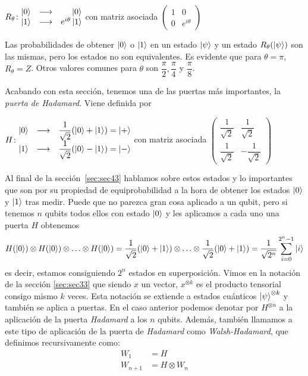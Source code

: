 $\gatetwo{R_\theta}{\ \ \ \ \ket0}{e^{i\theta}\ket1}$ con matriz asociada $\left(\begin{matrix}1&0\\ 0&e^{i\theta}\end{matrix}\right)$

Las probabilidades de obtener $\left|0\right\rangle$ o $\left|1\right\rangle$ en un estado $\left|\psi\right\rangle$ y un estado $R_\theta(\left|\psi\right\rangle)$ son las mismas, pero los estados no son equivalentes. Es evidente que para $\theta=\pi$, $R_\theta=Z$. Otros valores comunes para $\theta$ son $\dfrac{\pi}{2},\dfrac{\pi}{4}$ y $\dfrac{\pi}{8}$.

Acabando con esta sección, tenemos una de las puertas más importantes, la \textit{puerta de Hadamard}. Viene definida por

$H\colon \begin{matrix}\left|0\right\rangle&\longrightarrow& \dfrac{1}{\sqrt{2}}(\left|0\right\rangle+\left|1\right\rangle)=\left|+\right\rangle\\ \left|1\right\rangle&\longrightarrow& \dfrac{1}{\sqrt{2}}(\left|0\right\rangle-\left|1\right\rangle)=\left|-\right\rangle\end{matrix}$ con matriz asociada $\left(\begin{matrix}\dfrac{1}{\sqrt{2}}&\dfrac{1}{\sqrt{2}}\\ \dfrac{1}{\sqrt{2}}&-\dfrac{1}{\sqrt{2}}\end{matrix}\right)$

Al final de la sección~\ref{sec:sec43} hablamos sobre estos estados y lo importantes que son por su propiedad de equiprobabilidad a la hora de obtener los estados $\left|0\right\rangle$ y $\left|1\right\rangle$ tras medir. Puede que no parezca gran cosa aplicado a un qubit, pero si tenemos $n$ qubits todos ellos con estado $\left|0\right\rangle$ y les aplicamos a cada uno una puerta $H$ obtenemos
\begin{equation}
\label{eq:eq43}
H(\left|0\right\rangle)\otimes H(\left|0\right\rangle)\otimes\hdots\otimes H(\left|0\right\rangle)=\dfrac{1}{\sqrt{2}}(\left|0\right\rangle+\left|1\right\rangle)\otimes\hdots\otimes\dfrac{1}{\sqrt{2}}(\left|0\right\rangle+\left|1\right\rangle)=\dfrac{1}{\sqrt{2^n}}\sum_{i=0}^{2^n-1}\left|i\right\rangle
\end{equation}
%
es decir, estamos consiguiendo $2^n$ estados en superposición. Vimos en la notación de la sección \ref{sec:sec33} que siendo $x$ un vector, $x^{\otimes k}$ es el producto tensorial consigo mismo $k$ veces. Esta notación se extiende a estados cuánticos $\left|\psi\right\rangle^{\otimes k}$ y también se aplica a puertas. En el caso anterior podemos denotar por $H^{\otimes n}$ a la aplicación de la puerta \textit{Hadamard} a los $n$ qubits. Además, también llamamos a este tipo de aplicación de la puerta de \textit{Hadamard} como \textit{Walsh-Hadamard}, que definimos recursivamente como:
\[ \begin{split} W_1&=H\\ W_{n+1}&=H\otimes W_n \end{split} \]

